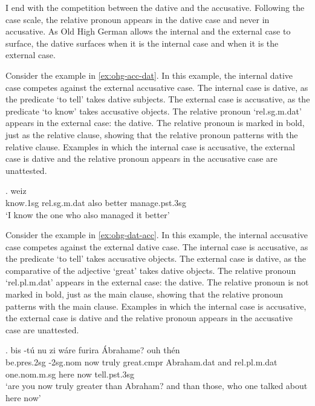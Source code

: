 I end with the competition between the dative and the accusative. Following the case scale, the relative pronoun appears in the dative case and never in accusative. As Old High German allows the internal and the external case to surface, the dative surfaces when it is the internal case and when it is the external case.

Consider the example in \ref{ex:ohg-acc-dat}. In this example, the internal dative case competes against the external accusative case.
The internal case is dative, as the predicate  `to tell' takes dative subjects.
The external case is accusative, as the predicate  `to know' takes accusative objects.
The relative pronoun  `\ac{rel}.\ac{sg}.\ac{m}.\ac{dat}' appears in the external case: the dative. The relative pronoun is marked in bold, just as the relative clause, showing that the relative pronoun patterns with the relative clause.
Examples in which the internal case is accusative, the external case is dative and the relative pronoun appears in the accusative case are unattested.

\exg. weiz    \\
know.1\ac{sg}\scsub{[acc]} \ac{rel}.\ac{sg}.\ac{m}.\ac{dat} also better manage.\ac{pst}.3\ac{sg}\scsub{[dat]}\\
`I know the one who also managed it better' \label{ex:ohg-acc-dat}

Consider the example in \ref{ex:ohg-dat-acc}. In this example, the internal accusative case competes against the external dative case.
The internal case is accusative, as the predicate  `to tell' takes accusative objects.
The external case is dative, as the comparative of the adjective  `great' takes dative objects.
The relative pronoun  `\ac{rel}.\ac{pl}.\ac{m}.\ac{dat}' appears in the external case: the dative. The relative pronoun is not marked in bold, just as the main clause, showing that the relative pronoun patterns with the main clause.
Examples in which the internal case is accusative, the external case is dative and the relative pronoun appears in the accusative case are unattested.

\exg. bis -tú nu {zi wáre} furira Ábrahame? ouh thén    \\
be.\ac{pres}.2\ac{sg} -2\ac{sg}.\ac{nom} now truly {great}.\ac{cmpr}\scsub{[dat]} Abraham.\ac{dat} and \ac{rel}.\ac{pl}.\ac{m}.\ac{dat} one.\ac{nom}.\ac{m}.\ac{sg} here now tell.\ac{pst}.3\ac{sg}\scsub{[acc]}\\
`are you now truly greater than Abraham? and than those, who one talked about here now' \label{ex:ohg-dat-acc}


